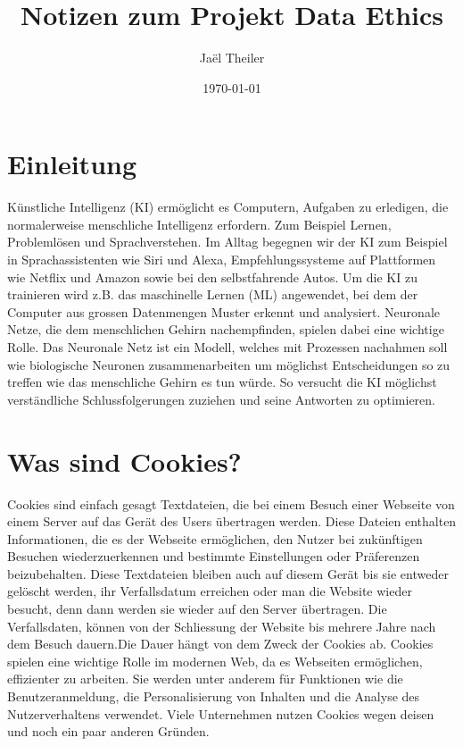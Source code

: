 \documentclass{article}
\title{Notizen zum Projekt Data Ethics}
\author{Jaël Theiler}
\date{\today}
\begin{document}
\maketitle

\abstract{}

\tableofcontents

\section{Einleitung}
Künstliche Intelligenz (KI) ermöglicht es Computern, Aufgaben zu erledigen, die normalerweise menschliche Intelligenz erfordern. Zum Beispiel Lernen, Problemlösen und Sprachverstehen. Im Alltag begegnen wir der KI zum Beispiel in Sprachassistenten wie Siri und Alexa, Empfehlungssysteme auf Plattformen wie Netflix und Amazon sowie bei den selbstfahrende Autos.
Um die KI zu trainieren wird z.B. das maschinelle Lernen (ML) angewendet, bei dem der Computer aus grossen Datenmengen Muster erkennt und analysiert. Neuronale Netze, die dem menschlichen Gehirn nachempfinden, spielen dabei eine wichtige Rolle. Das Neuronale Netz ist ein Modell, welches mit Prozessen nachahmen soll wie biologische Neuronen zusammenarbeiten um möglichst Entscheidungen so zu treffen wie das menschliche Gehirn es tun würde. So versucht die KI möglichst verständliche Schlussfolgerungen zuziehen und seine Antworten zu optimieren.

\section{Was sind Cookies?}
Cookies sind einfach gesagt Textdateien, die bei einem Besuch einer Webseite von einem Server auf das Gerät des Users übertragen werden. Diese Dateien enthalten Informationen, die es der Webseite ermöglichen, den Nutzer bei zukünftigen Besuchen wiederzuerkennen und bestimmte Einstellungen oder Präferenzen beizubehalten. Diese Textdateien bleiben auch auf diesem Gerät bis sie entweder gelöscht werden, ihr Verfallsdatum erreichen oder man die Website wieder besucht, denn dann werden sie wieder auf den Server übertragen. Die Verfallsdaten, können  von der Schliessung der Website bis mehrere Jahre nach dem Besuch dauern.Die Dauer hängt von dem Zweck der Cookies ab. Cookies spielen eine wichtige Rolle im modernen Web, da es Webseiten ermöglichen, effizienter zu arbeiten. Sie werden unter anderem für Funktionen wie die Benutzeranmeldung, die Personalisierung von Inhalten und die Analyse des Nutzerverhaltens verwendet. Viele Unternehmen nutzen Cookies wegen deisen und noch ein paar anderen Gründen.
\end{document}
